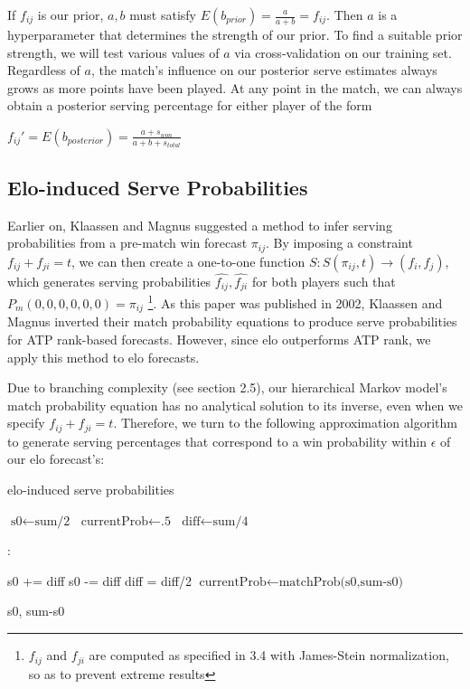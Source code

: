 \documentclass[chapterprefix=false]{report}
\begin{document}
If $f_{ij}$ is our prior, $a,b$ must satisfy $E(b_{prior}) = \frac{a}{a+b} = f_{ij}$. Then $a$ is a hyperparameter that determines the strength of our prior. To find a suitable prior strength, we will test various values of $a$ via cross-validation on our training set. Regardless of $a$, the match's influence on our posterior serve estimates always grows as more points have been played. At any point in the match, we can always obtain a posterior serving percentage for either player of the form

$f_{ij}' = E(b_{posterior}) = \frac{a + s_{won}}{a + b + s_{total}}$



\subsection{Elo-induced Serve Probabilities}
Earlier on, Klaassen and Magnus suggested a method to infer serving probabilities from a pre-match win forecast $\pi_{ij}$. By imposing a constraint $f_{ij}+f_{ji}=t$, we can then create a one-to-one function 
$S: S(\pi_{ij},t) \rightarrow (f_i,f_j)$, which generates serving probabilities $\hat{f_{ij}},\hat{f_{ji}}$ for both players such that $P_{m}(0,0,0,0,0,0)=\pi_{ij}$ \footnote{$f_{ij}$ and $f_{ji}$ are computed as specified in 3.4 with James-Stein normalization, so as to prevent extreme results}. As this paper was published in 2002, Klaassen and Magnus inverted their match probability equations to produce serve probabilities for ATP rank-based forecasts. However, since elo outperforms ATP rank, we apply this method to elo forecasts.

Due to branching complexity (see section 2.5), our hierarchical Markov model's match probability equation has no analytical solution to its inverse, even when we specify $f_{ij}+f_{ji}=t$. Therefore, we turn to the following approximation algorithm to generate serving percentages that correspond to a win probability within $\epsilon$ of our elo forecast's:

\begin{algorithm}[H]
\caption{elo-induced serve probabilities}\label{euclid}
\begin{algorithmic}[H]
\State $\text{s0} \gets \text{sum/2}$
\State $\text{currentProb} \gets \text{.5}$
\State $\text{diff} \gets \text{sum/4}$

:

\State s0 += diff 
\Else
\State s0 -= diff
\EndIf
\State diff = diff/2
\State $\text{currentProb} \gets \text{matchProb(s0,sum-s0)}$

\EndWhile


\State \Return s0, sum-s0

\EndProcedure
\end{algorithmic}
\end{algorithm}
\end{document}

